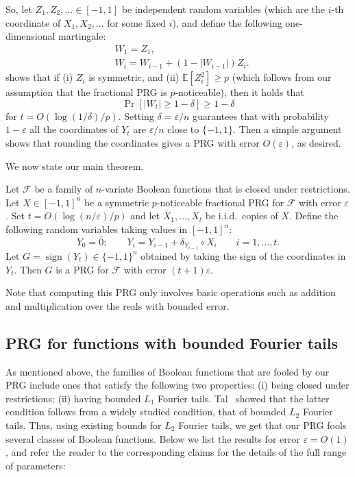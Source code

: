 \documentclass{toc}
\newcommand{\E}{\mathbb{E}}
\newcommand{\FF}{\mathcal{F}}
\newcommand{\eps}{\varepsilon}
\DeclareMathOperator{\sign}{sign}     %
\newcommand{\zero}{\overline{0}}
\begin{document}
So, let $Z_1,Z_2,\ldots \in [-1,1]$ be independent random variables (which are the $i$-th coordinate of $X_1,X_2,\ldots$ for some fixed $i$), and define the following one-dimensional martingale:
\begin{align*}
&W_1=Z_1,\\
&W_i=W_{i-1} + (1-|W_{i-1}|) Z_i.
\end{align*}
 shows that if (i) $Z_i$ is symmetric, and (ii) $\E[Z_i^2] \ge p$ (which follows from our assumption that the fractional PRG is $p$-noticeable), then it holds that
$$
\Pr[|W_t| \ge 1-\delta] \ge 1-\delta
$$
for $t=O(\log (1/\delta) / p)$. Setting $\delta=\eps/n$ guarantees that with probability $1-\eps$ all the coordinates of $Y_t$ are $\eps/n$ close to $\{-1,1\}$.
Then a simple argument shows that rounding the coordinates gives a PRG with error $O(\eps)$, as desired.

We now state our main theorem.

\begin{theorem}
\label{thm:main_informal}
Let $\FF$ be a family of $n$-variate Boolean functions that is closed under restrictions.
Let $X \in [-1,1]^n$ be a symmetric $p$-noticeable fractional PRG for $\FF$ with error $\eps$.
Set $t=O(\log(n/\eps)/p)$ and let $X_1,\ldots,X_t$ be i.i.d.\ copies of $X$.
Define the following random variables taking values in $[-1,1]^n$:
$$
Y_0=\zero; \qquad Y_i = Y_{i-1} + \delta_{Y_{i-1}} \circ X_i \qquad i=1,\ldots,t.
$$
Let $G=\sign(Y_t) \in \{-1,1\}^n$ obtained by taking the sign of the coordinates in $Y_t$.
Then $G$ is a PRG for $\FF$ with error $(t+1)\eps$.
\end{theorem}

Note that computing this PRG only involves basic operations such as addition and multiplication over the reals with bounded error. 
\subsection{PRG for functions with bounded Fourier tails}
As mentioned above, the families of Boolean functions that are fooled by our PRG include ones that satisfy the following two properties: (i) being closed under restrictions; (ii) having bounded $L_1$
Fourier tails. Tal~\cite{tal2017tight} showed that the latter condition follows from a widely studied condition, that of bounded $L_2$ Fourier tails.
Thus, using existing bounds for $L_2$ Fourier tails, we get that our PRG fools several classes of Boolean functions.
Below we list the results for error $\eps=O(1)$, and refer the reader to the corresponding claims for the details of the full range of parameters:
\end{document}

